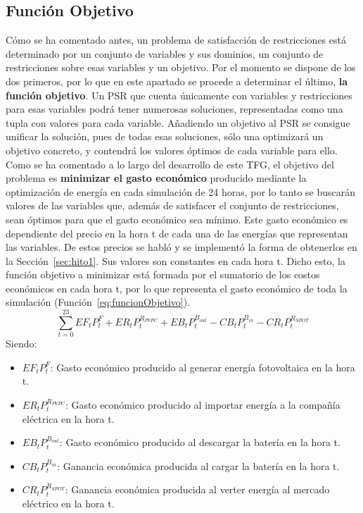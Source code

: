 \subsection{Función Objetivo}
Cómo se ha comentado antes, un problema de satisfacción de restricciones está determinado por un conjunto de variables y sus dominios, un conjunto de restricciones sobre esas variables y un objetivo. Por el momento se dispone de los dos primeros, por lo que en este apartado se procede a determinar el último, \textbf{la función objetivo}. Un PSR que cuenta únicamente con variables y restricciones para esas variables podrá tener numerosas soluciones, representadas como una tupla con valores para cada variable. Añadiendo un objetivo al PSR se consigue unificar la solución, pues de todas esas soluciones, sólo una optimizará un objetivo concreto, y contendrá los valores óptimos de cada variable para ello. Como se ha comentado a lo largo del desarrollo de este \gls{TFG}, el objetivo del problema es \textbf{minimizar el gasto económico} producido mediante la optimización de energía en cada simulación de 24 horas, por lo tanto se buscarán valores de las variables que, además de satisfacer el conjunto de restricciones, sean óptimos para que el gasto económico sea mínimo. Este gasto económico es dependiente del precio en la hora t de cada una de las energías que representan las variables. De estos precios se habló y se implementó la forma de obtenerlos en la Sección~\ref{sec:hito1}. Sus valores son constantes en cada hora t. Dicho esto, la función objetivo a minimizar está formada por el sumatorio de los costos económicos en cada hora t, por lo que representa el gasto económico de toda la simulación (Función~\ref{eq:funcionObjetivo}).
\begin{equation}
\label{eq:funcionObjetivo}
\sum_{t=0}^{23} EF_{t}P_{t}^{F} + ER_{t}P_{t}^{R_{PVPC}} + EB_{t}P_{t}^{B_{out}} - CB_{t}P_{t}^{B_{in}} - CR_{t}P_{t}^{R_{SPOT}}
\end{equation}
Siendo:
\begin{itemize}
\item $ EF_{t}P_{t}^{F} $: Gasto económico producido al generar energía fotovoltaica en la hora t.
\item $ ER_{t}P_{t}^{R_{PVPC}} $: Gasto económico producido al importar energía a la compañía eléctrica en la hora t.
\item $ EB_{t}P_{t}^{B_{out}} $: Gasto económico producido al descargar la batería en la hora t.
\item $ CB_{t}P_{t}^{B_{in}} $: Ganancia económica producida al cargar la batería en la hora t.
\item $ CR_{t}P_{t}^{R_{SPOT}} $: Ganancia económica producida al verter energía al mercado eléctrico en la hora t.
\end{itemize}

